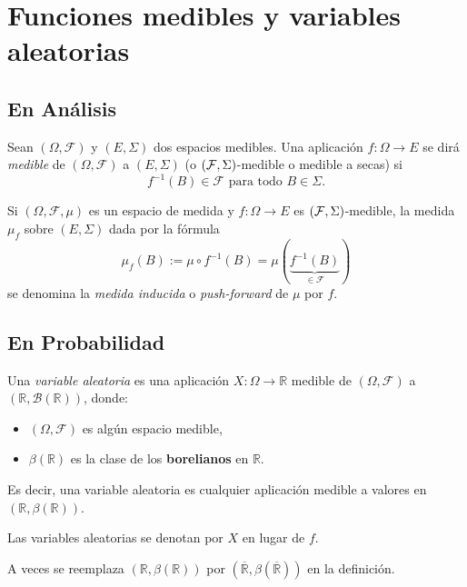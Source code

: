 
\section{Funciones medibles y variables aleatorias}

\subsection{En Análisis}

Sean \((\Omega, \mathcal{F})\) y \((E, \Sigma)\) dos espacios medibles. Una aplicación \(f: \Omega \to E\) se dirá \textit{medible} de \((\Omega, \mathcal{F})\) a \((E, \Sigma)\) (o \((\mathcal{F}, \Sigma)\)-medible o medible a secas) si 
\[ f^{-1}(B) \in \mathcal{F} \text{ para todo } B \in \Sigma. \]

Si \((\Omega, \mathcal{F}, \mu)\) es un espacio de medida y \(f: \Omega \to E\) es \((\mathcal{F}, \Sigma)\)-medible, la medida \(\mu_f\) sobre \((E, \Sigma)\) dada por la fórmula
\[
\mu_f(B) := \mu \circ f^{-1}(B) = \mu(\underbrace{f^{-1}(B)}_{\in \mathcal{F}})
\]
se denomina la \textit{medida inducida} o \textit{push-forward} de \(\mu\) por \(f\).

\subsection{En Probabilidad}
Una \textit{variable aleatoria} es una aplicación \(X: \Omega \to \mathbb{R}\) medible de \((\Omega, \mathcal{F})\) a \((\mathbb{R}, \mathcal{B}(\mathbb{R}))\), donde:
\begin{itemize}
    \item \((\Omega, \mathcal{F})\) es algún espacio medible,
    \item \(\beta(\mathbb{R})\) es la clase de los \textbf{borelianos} en \(\mathbb{R}\).
\end{itemize}
Es decir, una variable aleatoria es cualquier aplicación medible a valores en \((\mathbb{R}, \beta(\mathbb{R}))\).

\begin{notation}
	Las variables aleatorias se denotan por \(X\) en lugar de \(f\).
\end{notation}

\begin{remark}
    A veces se reemplaza \((\mathbb{R}, \beta(\mathbb{R}))\) por \((\overline{\mathbb{R}}, \beta(\overline{\mathbb{R}}))\) en la definición.
\end{remark}

